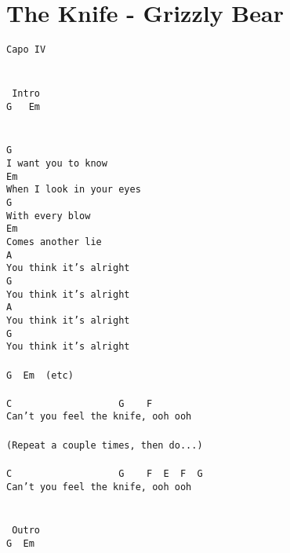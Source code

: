 \newpage
\section{The Knife - Grizzly Bear}
\label{The Knife - Grizzly Bear}
\texttt{Capo\ IV\\
\\
\\
\lbrack\ Intro\rbrack\\
G\ \ \ Em\\
\\
\\
G\\
I\ want\ you\ to\ know\\
Em\\
When\ I\ look\ in\ your\ eyes\\
G\\
With\ every\ blow\\
Em\\
Comes\ another\ lie\\
A\\
You\ think\ it's\ alright\\
G\\
You\ think\ it's\ alright\\
A\\
You\ think\ it's\ alright\\
G\\
You\ think\ it's\ alright\\
\\
G\ \ Em\ \ (etc)\\
\\
C\ \ \ \ \ \ \ \ \ \ \ \ \ \ \ \ \ \ \ G\ \ \ \ F\\
Can't\ you\ feel\ the\ knife,\ ooh\ ooh\\
\\
(Repeat\ a\ couple\ times,\ then\ do...)\\
\\
C\ \ \ \ \ \ \ \ \ \ \ \ \ \ \ \ \ \ \ G\ \ \ \ F\ \ E\ \ F\ \ G\\
Can't\ you\ feel\ the\ knife,\ ooh\ ooh\\
\\
\\
\lbrack\ Outro\rbrack\\
G\ \ Em}

